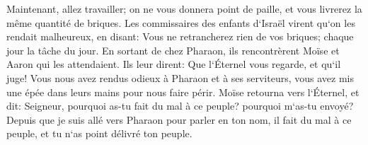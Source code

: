 \verse Maintenant, allez travailler; on ne vous donnera point de paille, et vous livrerez la même quantité de briques. 
\verse Les commissaires des enfants d`Israël virent qu`on les rendait malheureux, en disant: Vous ne retrancherez rien de vos briques; chaque jour la tâche du jour. 
\verse En sortant de chez Pharaon, ils rencontrèrent Moïse et Aaron qui les attendaient. 
\verse Ils leur dirent: Que l`Éternel vous regarde, et qu`il juge! Vous nous avez rendus odieux à Pharaon et à ses serviteurs, vous avez mis une épée dans leurs mains pour nous faire périr. 
\verse Moïse retourna vers l`Éternel, et dit: Seigneur, pourquoi as-tu fait du mal à ce peuple? pourquoi m`as-tu envoyé? 
\verse Depuis que je suis allé vers Pharaon pour parler en ton nom, il fait du mal à ce peuple, et tu n`as point délivré ton peuple. 

\chapter{}

